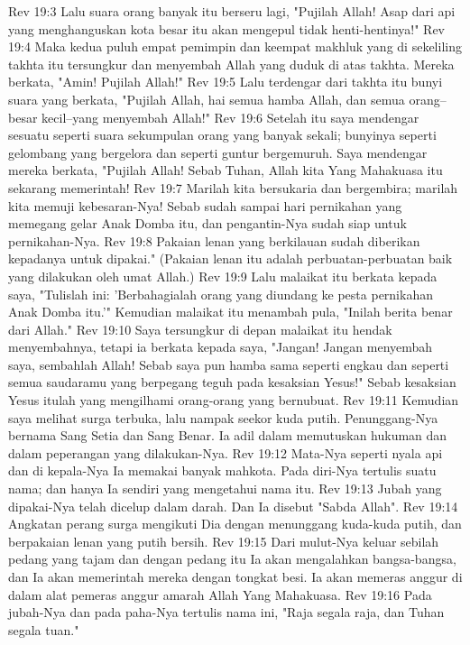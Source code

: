 Rev 19:3  Lalu suara orang banyak itu berseru lagi, "Pujilah Allah! Asap dari api yang menghanguskan kota besar itu akan mengepul tidak henti-hentinya!"
Rev 19:4  Maka kedua puluh empat pemimpin dan keempat makhluk yang di sekeliling takhta itu tersungkur dan menyembah Allah yang duduk di atas takhta. Mereka berkata, "Amin! Pujilah Allah!"
Rev 19:5  Lalu terdengar dari takhta itu bunyi suara yang berkata, "Pujilah Allah, hai semua hamba Allah, dan semua orang--besar kecil--yang menyembah Allah!"
Rev 19:6  Setelah itu saya mendengar sesuatu seperti suara sekumpulan orang yang banyak sekali; bunyinya seperti gelombang yang bergelora dan seperti guntur bergemuruh. Saya mendengar mereka berkata, "Pujilah Allah! Sebab Tuhan, Allah kita Yang Mahakuasa itu sekarang memerintah!
Rev 19:7  Marilah kita bersukaria dan bergembira; marilah kita memuji kebesaran-Nya! Sebab sudah sampai hari pernikahan yang memegang gelar Anak Domba itu, dan pengantin-Nya sudah siap untuk pernikahan-Nya.
Rev 19:8  Pakaian lenan yang berkilauan sudah diberikan kepadanya untuk dipakai." (Pakaian lenan itu adalah perbuatan-perbuatan baik yang dilakukan oleh umat Allah.)
Rev 19:9  Lalu malaikat itu berkata kepada saya, "Tulislah ini: 'Berbahagialah orang yang diundang ke pesta pernikahan Anak Domba itu.'" Kemudian malaikat itu menambah pula, "Inilah berita benar dari Allah."
Rev 19:10  Saya tersungkur di depan malaikat itu hendak menyembahnya, tetapi ia berkata kepada saya, "Jangan! Jangan menyembah saya, sembahlah Allah! Sebab saya pun hamba sama seperti engkau dan seperti semua saudaramu yang berpegang teguh pada kesaksian Yesus!" Sebab kesaksian Yesus itulah yang mengilhami orang-orang yang bernubuat.
Rev 19:11  Kemudian saya melihat surga terbuka, lalu nampak seekor kuda putih. Penunggang-Nya bernama Sang Setia dan Sang Benar. Ia adil dalam memutuskan hukuman dan dalam peperangan yang dilakukan-Nya.
Rev 19:12  Mata-Nya seperti nyala api dan di kepala-Nya Ia memakai banyak mahkota. Pada diri-Nya tertulis suatu nama; dan hanya Ia sendiri yang mengetahui nama itu.
Rev 19:13  Jubah yang dipakai-Nya telah dicelup dalam darah. Dan Ia disebut "Sabda Allah".
Rev 19:14  Angkatan perang surga mengikuti Dia dengan menunggang kuda-kuda putih, dan berpakaian lenan yang putih bersih.
Rev 19:15  Dari mulut-Nya keluar sebilah pedang yang tajam dan dengan pedang itu Ia akan mengalahkan bangsa-bangsa, dan Ia akan memerintah mereka dengan tongkat besi. Ia akan memeras anggur di dalam alat pemeras anggur amarah Allah Yang Mahakuasa.
Rev 19:16  Pada jubah-Nya dan pada paha-Nya tertulis nama ini, "Raja segala raja, dan Tuhan segala tuan."
